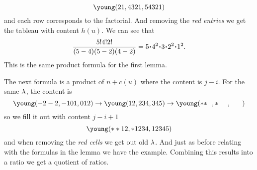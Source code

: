 \documentclass[12pt]{memoir}
\begin{document}
$$\young(21,4321,54321)$$
and each row corresponds to the factorial. And removing the \emph{red entries} we get the tableau with content $h(u)$. We can see that 
$$\frac{5!4!2!}{(5-4)(5-2)(4-2)}=5\.4^2\.3\.2^2\.1^2.$$
This is the same product formula for the first lemma.\par 
The next formula is a product of $n+c(u)$ where the content is $j-i$. For the same $\lambda$, the content is 
$$\young(-2-2,-101,012)\to\young(12,234,345)\to\young(**~~,*~~~~,~~~~~)$$
so we fill it out with content $j-i+1$
$$\young(**12,*1234,12345)$$ 
and when removing the \emph{red cells} we get out old $\lambda$. And just as before relating with the formulas in the lemma we have the example. Combining this results into a ratio we get a quotient of ratios.
\ifx\nextra\undefined
\printindex
\else\fi
\nocite{*}


\end{document}
